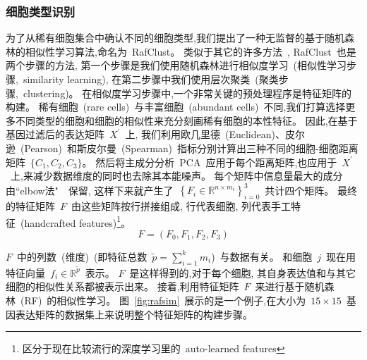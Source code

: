 \subsubsection{细胞类型识别}
\label{subsec:rafclust} 
为了从稀有细胞集合中确认不同的细胞类型,我们提出了一种无监督的基于随机森林的相似性学习算法,命名为~RafClust。
类似于其它的许多方法~\cite{kiselev2017sc3,pouyan2018random,mohammadi2018geometric,sinha2018dropclust,Srinivasan511626,Li530378,zheng2019sinnlrr},
RafClust~也是两个步骤的方法,
第一个步骤是我们使用随机森林进行相似度学习~(相似性学习步骤,~similarity learning),
在第二步骤中我们使用层次聚类~(聚类步骤,~clustering)。
在相似度学习步骤中,一个非常关键的预处理程序是特征矩阵的构建。
稀有细胞~(rare cells)~与丰富细胞~(abundant cells)~不同,我们打算选择更多不同类型的细胞和细胞的相似性来充分刻画稀有细胞的本性特征。
因此,在基于基因过滤后的表达矩阵~$X^{\prime}$~上,
我们利用欧几里德~(Euclidean)、皮尔逊~(Pearson)~和斯皮尔曼~(Spearman)~指标分别计算出三种不同的细胞-细胞距离矩阵~$\{C_1, C_2, C_3\}$。
然后将主成分分析~PCA~应用于每个距离矩阵,也应用于~$X^{\prime}$~上,来减少数据维度的同时也去除其本能噪声。
每个矩阵中信息量最大的成分由``elbow法"~\cite{thorndike1953belongs}~保留,
这样下来就产生了~$\left\{ {F}_{i} \in \mathbb {R} ^ {n \times m_{i}} \right\}_{i = 0}^{3}$~共计四个矩阵。
最终的特征矩阵~$F$~由这些矩阵按行拼接组成, 行代表细胞, 列代表手工特征~(handcrafted features)\footnote{区分于现在比较流行的深度学习里的~auto-learned features}。
\begin{equation}
\label{lab:f}
{F} = ({F}_{0}, {F}_{1}, {F}_{2}, {F}_{3})
\end{equation}

$F$~中的列数~(维度)~(即特征总数~$\tilde {p} = \sum_{i = 1}^{k} m_{i}$)~与数据有关。
和细胞~$j$~现在用特征向量~$f_{i} \in \mathbb {R} ^ {\tilde{p}}$~表示。
$F$~是这样得到的,对于每个细胞,
其自身表达值和与其它细胞的相似性关系都被表示出来。
接着,利用特征矩阵~$F$~来进行基于随机森林~(RF)~的相似性学习。
图~\ref{fig:rafsim}~展示的是一个例子,在大小为~$15 \times 15$~基因表达矩阵的数据集上来说明整个特征矩阵的构建步骤。

\begin{figure}[!htbp]
\end{figure}

